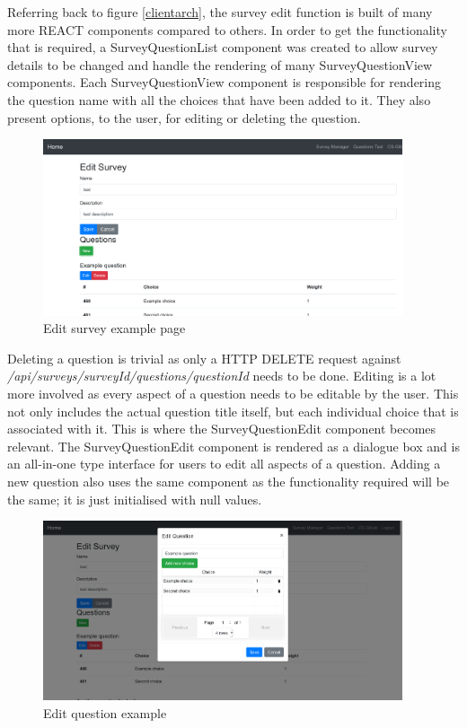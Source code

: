 Referring back to figure \ref{clientarch}, the survey edit function is built of many more REACT components compared to others.
In order to get the functionality that is required, a SurveyQuestionList component was created to allow survey details to be changed 
and handle the rendering of many SurveyQuestionView components.
Each SurveyQuestionView component is responsible for rendering the question name with all the choices that have been added to it.
They also present options, to the user, for editing or deleting the question.

\begin{figure}[ht]
    \centering
    \includegraphics[width=400px]{images/edit_survey_screen.png}
    \caption{Edit survey example page}
    \label{editsurveyexample}
\end{figure}

Deleting a question is trivial as only a HTTP DELETE request against \textit{/api/surveys/{surveyId}/questions/{questionId}} needs to be done.
Editing is a lot more involved as every aspect of a question needs to be editable by the user.
This not only includes the actual question title itself, but each individual choice that is associated with it.
This is where the SurveyQuestionEdit component becomes relevant.
The SurveyQuestionEdit component is rendered as a dialogue box and is an all-in-one type interface for users to edit all aspects of 
a question. 
Adding a new question also uses the same component as the functionality required will be the same; it is just initialised
with null values.

\begin{figure}[ht]
    \centering
    \includegraphics[width=400px]{images/edit_question_screen.png}
    \caption{Edit question example}
    \label{editquestionexample}
\end{figure}


